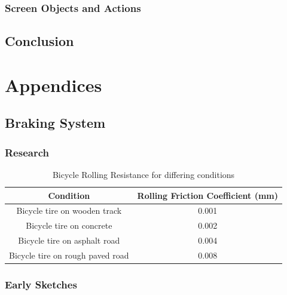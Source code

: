 \documentclass[a4paper]{report}
\begin{document}
\section{Screen Objects and Actions}

\chapter{Conclusion}

\part*{Appendices}

\appendix
\chapter{Braking System}
\section{Research}

\begin{table}[h]

    \begin{tabular}{ | c | c |}
    \hline
    \textbf{Condition} & \textbf{Rolling Friction Coefficient (mm)} \\ \hline
   
   Bicycle tire on wooden track & 0.001   \\ \hline
   Bicycle tire on concrete & 0.002 \\ \hline
  Bicycle tire on asphalt road & 0.004 \\ \hline
  Bicycle tire on rough paved road & 0.008 \\ \hline

  \end{tabular}

\caption[Table caption text]{Bicycle Rolling Resistance for differing conditions \cite{cite:bicycle_friction}} 
\label{table:bicycle_friction}
\end{table}

\section{Early Sketches}
\label{app:early_sketches}
\end{document}

